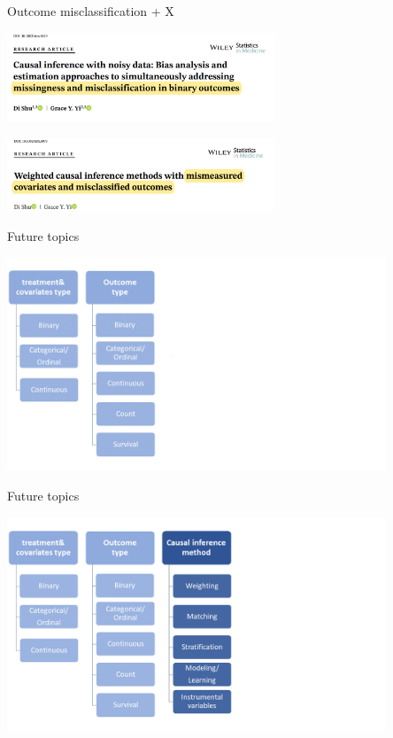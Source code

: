 \documentclass[12pt,aspectratio=169]{beamer}
\begin{document}
\begin{frame}{Outcome misclassification + X}
  \begin{center}
     \includegraphics[width=0.6\textwidth]{ext1.png}
    
       \includegraphics[width=0.6\textwidth]{ext2.png}
     \end{center}
\end{frame}




\begin{frame}{Future topics}
 \begin{center}
     \includegraphics[width=0.85\textwidth]{fi1.png}
     \end{center}
\end{frame}


\begin{frame}{Future topics}
 \begin{center}
     \includegraphics[width=0.85\textwidth]{fi2.png}
     \end{center}
\end{frame}
\end{document}
